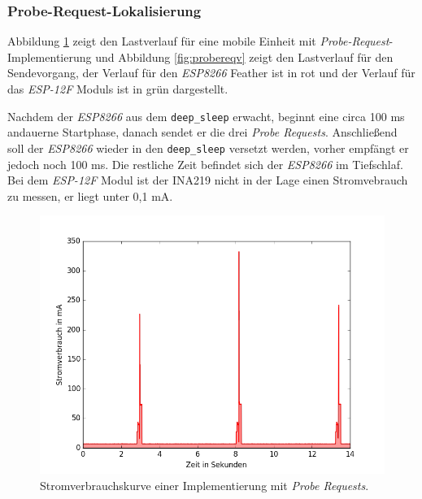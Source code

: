 \subsubsection{Probe-Request-Lokalisierung}
\label{ch:phase2:sec:powerprobereq}
Abbildung \ref{fig:probereqfull} zeigt den Lastverlauf für eine mobile Einheit mit \emph{Probe-Request}-Implementierung und Abbildung \ref{fig:probereqv} zeigt den Lastverlauf für den Sendevorgang, der Verlauf für den \emph{ESP8266} Feather ist in rot und der Verlauf für das \emph{ESP-12F} Moduls ist in grün dargestellt.

Nachdem der \emph{ESP8266} aus dem \texttt{deep\_sleep} erwacht, beginnt eine circa 100 ms andauerne Startphase, danach sendet er die drei \emph{Probe Requests}.
Anschließend soll der \emph{ESP8266} wieder in den \texttt{deep\_sleep} versetzt werden, vorher empfängt er jedoch noch 100 ms.
Die restliche Zeit befindet sich der \emph{ESP8266} im Tiefschlaf. 
Bei dem \emph{ESP-12F} Modul ist der INA219 nicht in der Lage einen Stromvebrauch zu messen, er liegt unter 0,1 mA.

\begin{figure}[h!]
  \centering
	\includegraphics[width=\textwidth]{plots/probereqfull.png}
  \caption{Stromverbrauchskurve einer Implementierung mit \emph{Probe Requests}.}
  \label{fig:probereqfull}
\end{figure}

